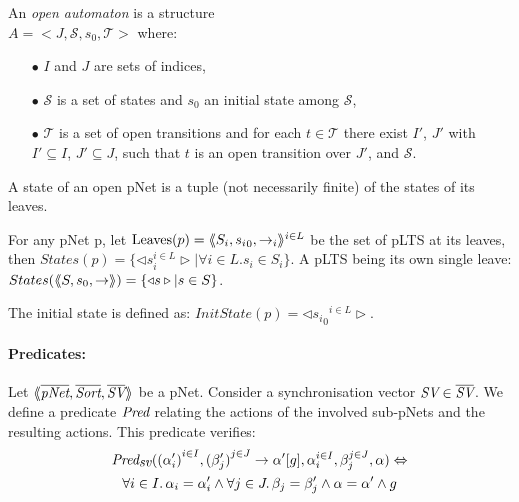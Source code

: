 \documentclass[runningheads,a4paper]{llncs}
\begin{document}
\begin{definition}
	\label{def:open-automaton}
	An \emph{open automaton} is a structure\\ $A =
	<J,\mathcal{S},s_0,\mathcal{T}>$ where:
	\begin{itemize}
		\item[$\bullet$]  $I$ and $J$ are  sets of indices,
		\item[$\bullet$]   $\mathcal{S}$ is a set of states and $s_0$ an initial state
		among $\mathcal{S}$,
		\item[$\bullet$] $\mathcal{T}$ is a set of open transitions and for each
		$t\in \mathcal{T}$ there exist $I'$, $J'$ with $I'\subseteq I$, $J'
		\subseteq J$, such that $t$ is an open transition over $J'$,
		and  $\mathcal{S}$.
		
	\end{itemize}
\end{definition}
	

\begin{definition}\label{def-states}
  A state of an open pNet is a tuple (not necessarily finite) of the
  states of its leaves.

  For any pNet p, let $\operatorname{Leaves}(p) = \langle\hspace{-0.58ex}\langle S_i,{s_i}_0, \to_i\rangle\hspace{-0.58ex}\rangle^{i \in L}$ be 
  the set of pLTS at its leaves,
  then $States(p) = \{\triangleleft s_i^{i\in L}
  \triangleright| \forall i\in L. s_i \in S_i\}$.
A pLTS being its own single leave:
  $States(\langle\hspace{-0.58ex}\langle S,s_0, \to\rangle\hspace{-0.58ex}\rangle) = \{\triangleleft s \triangleright| s \in S\}$.

The initial state is defined as:
$InitState(p) = \triangleleft {{s_i}_0}^{i\in L}  \triangleright$.
\end{definition}

\paragraph{Predicates:}
Let
$\mylangle\overline{\pNet},\overline{\Sort},\overline{\symb{SV}}\myrangle$
be a pNet. Consider a synchronisation vector $\symb{SV}\in \overline{\symb{SV}}$. We 
define a
predicate $\Pred$ relating
the actions of the involved sub-pNets and the resulting actions. This predicate verifies:
\begin{multline}
\Pred_{\symb{sv}}(\SV{{(\alpha'_i)}^{i\in I}, {(\beta'_j)}^{j\in J}} 
{\alpha'} {g}, \alpha_i^{i\in I}, \beta_j^{j\in J}, \alpha)\Leftrightarrow \\
\forall i\in I.\, \alpha_i=\alpha'_i\land \forall j \in J.\, \beta_j=\beta'_j \land 
\alpha=\alpha' 
\land g
\end{multline}
\end{document}
